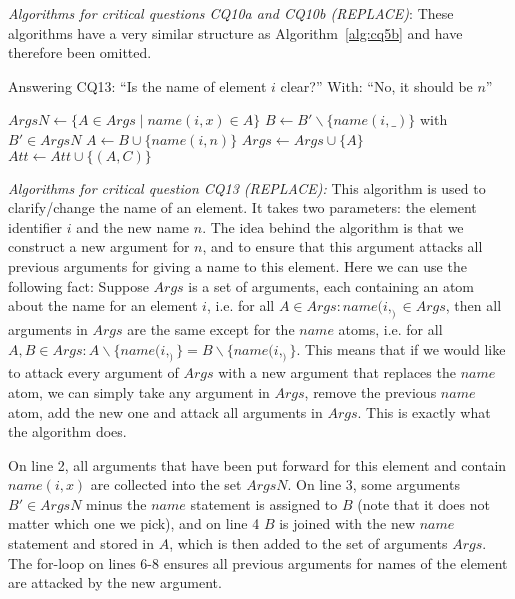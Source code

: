 \emph{Algorithms for critical questions CQ10a and CQ10b (REPLACE)}: These algorithms have a very similar structure as Algorithm~\ref{alg:cq5b} and have therefore been omitted.

\begin{algorithm}[h]
  \caption{Answering CQ13: ``Is the name of element $i$ clear?'' With: ``No, it should be $n$''}\label{alg:cq13}
  \begin{algorithmic}[1]
    \State $ArgsN \gets\{ A\in Args \mid name(i,x)\in A\}$
    \State $B\gets B'\backslash \{name(i,\_)\}$ with $B'\in ArgsN$
    \State $A \gets B \cup \{name(i,n)\}$
    \State $Args \gets Args \cup \{A\}$
      \State $Att\gets Att \cup \{(A,C)\}$
    \EndFor
    \EndProcedure
  \end{algorithmic}
\end{algorithm}

\emph{Algorithms for critical question CQ13 (REPLACE):} This algorithm is used to clarify/change the name of an element. It takes two parameters: the element identifier $i$ and the new name $n$. The idea behind the algorithm is that we construct a new argument for $n$, and to ensure that this argument attacks all previous arguments for giving a name to this element. Here we can use the following fact: Suppose $Args$ is a set of arguments, each containing an atom about the name for an element $i$, i.e. for all $A\in Args: name(i,_)\in Args$, then all arguments in $Args$ are the same except for the $name$ atoms, i.e. for all $A,B\in Args: A\backslash\{name(i,_)\} = B\backslash\{name(i,_)\}$. This means that if we would like to attack every argument of $Args$ with a new argument that replaces the $name$ atom, we can simply take any argument in $Args$, remove the previous $name$ atom, add the new one and attack all arguments in $Args$. This is exactly what the algorithm does.


On line 2, all arguments that have been put forward for this element and contain $name(i,x)$ are collected into the set $ArgsN$. On line 3, some arguments $B'\in ArgsN$ minus the $name$ statement is assigned to $B$ (note that it does not matter which one we pick), and on line 4 $B$ is joined with the new $name$ statement and stored in $A$, which is then added to the set of arguments $Args$. The for-loop on lines 6-8 ensures all previous arguments for names of the element are attacked by the new argument.


